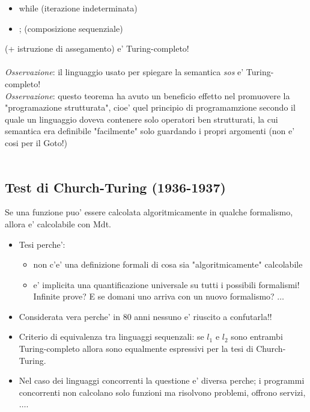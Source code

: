 \documentclass[a4paper,12pt]{article}
\begin{document}
{\begin{itemize}
  \item while \quad (iterazione indeterminata)
  \item ; \quad (composizione sequenziale) 
\end{itemize}
(+ istruzione di assegamento) e' Turing-completo! \\
\vspace{5px}\\
\textit{Osservazione}: il linguaggio usato per spiegare la semantica \textit{sos} e' Turing-completo! \\
\textit{Osservazione}: questo teorema ha avuto un beneficio effetto nel promuovere la "programazione strutturata", cioe' quel principio di programamzione secondo il quale un linguaggio doveva contenere solo operatori ben strutturati, la cui semantica era definibile "facilmente" solo guardando i propri argomenti (non e' cosi per il Goto!) \\
\vspace{1em}\\
\subsection{Test di Church-Turing (1936-1937)}
Se una funzione puo' essere calcolata algoritmicamente in qualche formalismo, allora e' calcolabile con Mdt.
\begin{itemize}
  \item Tesi perche':
  \begin{itemize}
    \item non c'e' una definizione formali di cosa sia "algoritmicamente" calcolabile
    \item e' implicita una quantificazione universale su tutti i possibili formalismi! Infinite prove? E se domani uno arriva con un nuovo formalismo? $\dots$
  \end{itemize}
  \item Considerata vera perche' in 80 anni nessuno e' riuscito a confutarla!!
  \item Criterio di equivalenza tra linguaggi sequenzali: se $l_1$ e $l_2$ sono entrambi Turing-completo allora sono equalmente espressivi per la tesi di Church-Turing.
  \item Nel caso dei linguaggi concorrenti la questione e' diversa perche; i programmi concorrenti non calcolano solo funzioni ma risolvono problemi, offrono servizi, $\dots$.
\end{itemize} 
\vspace{1em}
}
\end{document}
